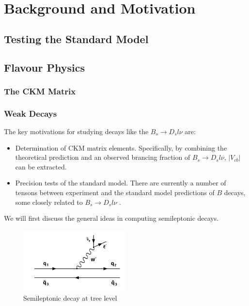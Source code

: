 \chapter{Background and Motivation}
\label{chap:background}

\section{Testing the Standard Model}
\section{Flavour Physics}
\subsection{The CKM Matrix}
\subsection{Weak Decays}

The key motivations for studying decays like the $B_s \to D_s l\nu$ are:
\begin{itemize}
	\item
	Determination of CKM matrix elements. Specifically, by combining the theoretical prediction and an observed brancing fraction of $B_s \to D_s l\nu$, $|V_{cb}|$ can be extracted.
	\item
	Precision tests of the standard model. There are currently a number of tensons between experiment and the standard model predictions of $B$ decays, some closely related to $B_s \to D_s l\nu$ \cite{Na:2015kha}.
\end{itemize}
We will first discuss the general ideas in computing semileptonic decays.


\begin{figure}
  \begin{center}
  \vspace{-25pt}
    \includegraphics[width=
   0.5\textwidth]{images/semileptonic.png}
     \vspace{-25pt}
  \end{center}
  \caption{Semileptonic decay at tree level}
  \vspace{+10pt}
  \label{fig:semileptonic}
\end{figure}

